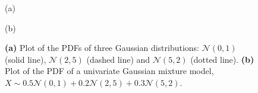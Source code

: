 \begin{figure}
  \begin{minipage}{0.5\textwidth}
    \centering

    (a)
  \end{minipage}\begin{minipage}{0.5\textwidth}
    \centering

    (b)
  \end{minipage}

  \caption[Plot of Gaussian distributions and GMM]{
    \textbf{(a)} Plot of the PDFs of three Gaussian distributions: $\mathcal{N}(0, 1)$ (solid line), $\mathcal{N}(2, 5)$ (dashed line) and $\mathcal{N}(5, 2)$ (dotted line).
    \textbf{(b)} Plot of the PDF of a univariate Gaussian mixture model, $X \sim 0.5 \mathcal{N}(0, 1) + 0.2 \mathcal{N}(2, 5) + 0.3 \mathcal{N}(5, 2)$.
  }
  \label{fig:gaussian}
\end{figure}

